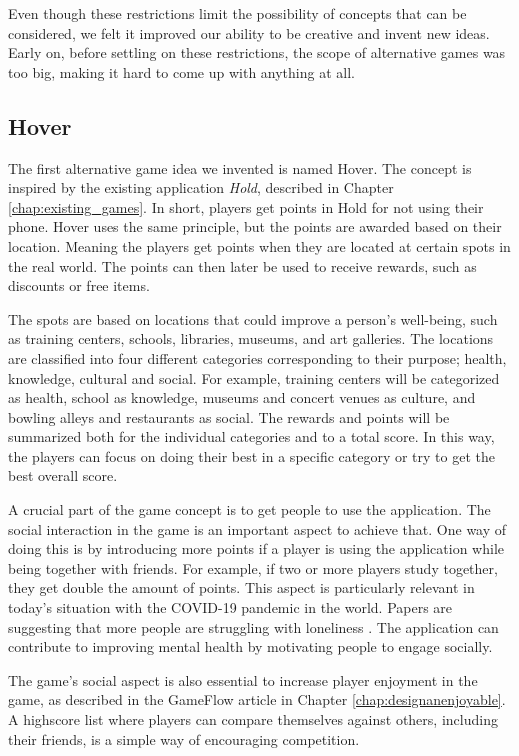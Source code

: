 \documentclass[../Main.tex]{subfiles}
\begin{document}
Even though these restrictions limit the possibility of concepts that can be considered, we felt it improved our ability to be creative and invent new ideas. Early on, before settling on these restrictions, the scope of alternative games was too big, making it hard to come up with anything at all.

\subsection{Hover}
\label{sec:hover}
The first alternative game idea we invented is named Hover. The concept is inspired by the existing application \textit{Hold}, described in Chapter \ref{chap:existing_games}. In short, players  get points in Hold for not using their phone. Hover uses the same principle, but the points are awarded based on their location. Meaning the players get points when they are located at certain spots in the real world. The points can then later be used to receive rewards, such as discounts or free items.

The spots are based on locations that could improve a person’s well-being, such as training centers, schools, libraries, museums, and art galleries. The locations are classified into four different categories corresponding to their purpose; health, knowledge, cultural and social. For example, training centers will be categorized as health, school as knowledge, museums and concert venues as culture, and bowling alleys and restaurants as social. The rewards and points will be summarized both for the individual categories and to a total score. In this way, the players can focus on doing their best in a specific category or try to get the best overall score. 

A crucial part of the game concept is to get people to use the application. The social interaction in the game is an important aspect to achieve that. One way of doing this is by introducing more points if a player is using the application while being together with friends. For example, if two or more players study together, they get double the amount of points. This aspect is particularly relevant in today’s situation with the COVID-19 pandemic in the world. Papers are suggesting that more people are struggling with loneliness \citep{groarke_loneliness_2020}. The application can contribute to improving mental health by motivating people to engage socially.

The game’s social aspect is also essential to increase player enjoyment in the game, as described in the GameFlow article in Chapter \ref{chap:designanenjoyable}. A highscore list where players can compare themselves against others, including their friends, is a simple way of encouraging competition. 
\end{document}
